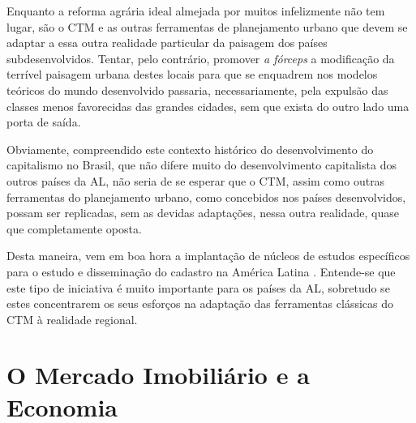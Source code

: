 \documentclass[
	12pt,				%
	oneside,			%
	a4paper,			%
	chapter=TITLE,		%
	section=TITLE,		%
	english,			%
	brazil				%
	]{abntex2}
\begin{document}
\begin{refsection}
Enquanto a reforma agrária ideal almejada por muitos infelizmente não tem lugar,
são o \gls{CTM} e as outras ferramentas de planejamento urbano que devem se
adaptar a essa outra realidade particular da paisagem dos países
subdesenvolvidos. Tentar, pelo contrário, promover \emph{a fórceps} a modificação da
terrível paisagem urbana destes locais para que se enquadrem nos modelos
teóricos do mundo desenvolvido passaria, necessariamente, pela expulsão das
classes menos favorecidas das grandes cidades, sem que exista do outro lado uma
porta de saída.

Obviamente, compreendido este contexto histórico do desenvolvimento do
capitalismo no Brasil, que não difere muito do desenvolvimento capitalista dos
outros países da \gls{AL}, não seria de se esperar que o \gls{CTM}, assim como
outras ferramentas do planejamento urbano, como concebidos nos países
desenvolvidos, possam ser replicadas, sem as devidas adaptações, nessa outra
realidade, quase que completamente oposta.

Desta maneira, vem em boa hora a implantação de núcleos de estudos específicos
para o estudo e disseminação do cadastro na América Latina \autocite{lalan}. Entende-se
que este tipo de iniciativa é muito importante para os países da \gls{AL},
sobretudo se estes concentrarem os seus esforços na adaptação das ferramentas
clássicas do \gls{CTM} à realidade regional.

\printbibliography[heading=subbibintoc]
\end{refsection}
\hypertarget{economia}{%
\chapter{O Mercado Imobiliário e a Economia}\label{economia}}
\end{document}
